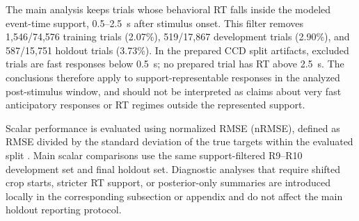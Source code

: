 \documentclass[12pt]{article}
\begin{document}
The main analysis keeps trials whose behavioral RT falls inside the modeled event-time support, 0.5--2.5~s after stimulus onset. This filter removes 1{,}546/74{,}576 training trials (2.07\%), 519/17{,}867 development trials (2.90\%), and 587/15{,}751 holdout trials (3.73\%). In the prepared CCD split artifacts, excluded trials are fast responses below 0.5~s; no prepared trial has RT above 2.5~s. The conclusions therefore apply to support-representable responses in the analyzed post-stimulus window, and should not be interpreted as claims about very fast anticipatory responses or RT regimes outside the represented support.

Scalar performance is evaluated using normalized RMSE (nRMSE), defined as RMSE divided by the standard deviation of the true targets within the evaluated split \citep{EEGChallengeWebsite2025}. Main scalar comparisons use the same support-filtered R9--R10 development set and final holdout set. Diagnostic analyses that require shifted crop starts, stricter RT support, or posterior-only summaries are introduced locally in the corresponding subsection or appendix and do not affect the main holdout reporting protocol.
\end{document}
